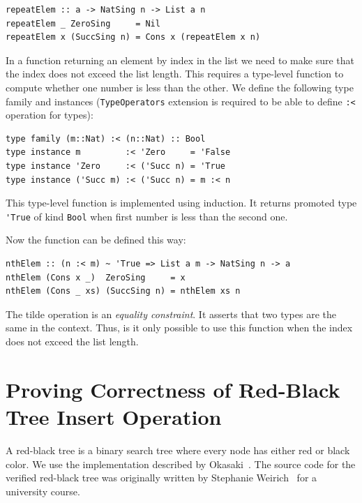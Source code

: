 \documentclass{tmr}
\newcommand{\italic}[1]{\textit{#1}}
\begin{document}
\begin{Verbatim}
repeatElem :: a -> NatSing n -> List a n
repeatElem _ ZeroSing     = Nil
repeatElem x (SuccSing n) = Cons x (repeatElem x n)
\end{Verbatim}

In a function returning an element by index in the list we need to make sure that the index does not exceed the list length. This requires a type-level function to compute whether one number is less than the other. We define the following type family and instances (\verb|TypeOperators| extension is required to be able to define \verb|:<| operation for types):

\begin{Verbatim}
type family (m::Nat) :< (n::Nat) :: Bool
type instance m         :< 'Zero     = 'False
type instance 'Zero     :< ('Succ n) = 'True
type instance ('Succ m) :< ('Succ n) = m :< n
\end{Verbatim}

This type-level function is implemented using induction. It returns promoted type \verb|'True| of kind \verb|Bool| when first number is less than the second one.

Now the function can be defined this way:

\begin{Verbatim}
nthElem :: (n :< m) ~ 'True => List a m -> NatSing n -> a
nthElem (Cons x _)  ZeroSing     = x
nthElem (Cons _ xs) (SuccSing n) = nthElem xs n
\end{Verbatim}

The tilde operation is an \italic{equality constraint}. It asserts that two types are the same in the context. Thus, is it only possible to use this function when the index does not exceed the list length.


\section{Proving Correctness of Red-Black Tree Insert Operation}
\label{sec:red_black}

A red-black tree is a binary search tree where every node has either red or black color. We use the implementation described by Okasaki~\cite{okasaki_red_black_trees}. The source code for the verified red-black tree was originally written by Stephanie Weirich~\cite{weirich_dependently_typed} for a university course.
\end{document}

